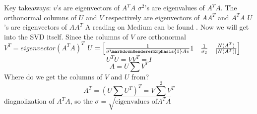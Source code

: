 Key takeaways:\markdownRendererInterblockSeparator
{}\markdownRendererUlBegin
\markdownRendererUlItem $v$'s are eigenvectors of $A^TA$\markdownRendererUlItemEnd 
\markdownRendererUlItem $\sigma^2$'s are eigenvalues of $A^TA$.\markdownRendererUlItemEnd 
\markdownRendererUlItem The orthonormal columns of $U$ and $V$ respectively are eigenvectors of $AA^T$ and $A^TA$\markdownRendererUlItemEnd 
\markdownRendererUlItem $U$'s are eigenvectors of $AA^T$\markdownRendererUlItemEnd 
\markdownRendererUlEnd \markdownRendererInterblockSeparator
{}A reading on Medium can be found . Now we will get into the SVD itself. Since the columns of $V$ are orthonormal\markdownRendererEllipsis{}\markdownRendererInterblockSeparator
{}\markdownRendererUlBegin
\markdownRendererUlItem $V^T = eigenvector(A^TA)^T$\markdownRendererUlItemEnd 
\markdownRendererUlItem $U = \begin{bmatrix}\frac{1}{\sigma\markdownRendererEmphasis{1}Av}1 & \frac{1}{\sigma_2} & \frac{N(A^T)}{|N(A^T)|}\end{bmatrix}$\markdownRendererUlItemEnd 
\markdownRendererUlEnd \markdownRendererInterblockSeparator
{}$$U^TU=VV^T=I$$\markdownRendererInterblockSeparator
{}$$A = U\sum V^T$$\markdownRendererInterblockSeparator
{}Where do we get the columns of $V$ and $U$ from?\markdownRendererInterblockSeparator
{}$$A^T = (U\sum U^T)^T=V\sum^2 V^T$$\markdownRendererInterblockSeparator
{}diagnolization of $A^TA$, so the $\sigma=\sqrt{\text{eigenvalues of}A^TA}$\relax